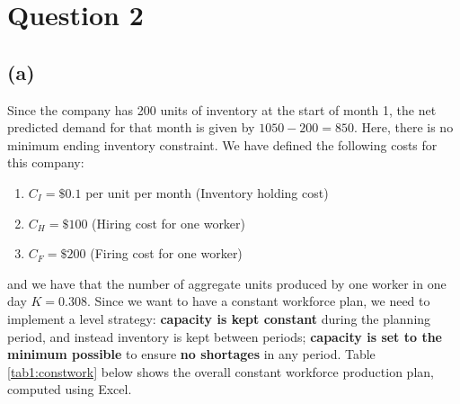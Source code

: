 \documentclass[12pt]{article}
\begin{document}
\newpage 

\section*{Question 2}


\subsection*{(a)}   

Since the company has 200 units of inventory at the start of month 1, the net predicted demand for that month is given by $1050 - 200 = 850$. Here, there is no minimum ending inventory constraint. We have defined the following costs for this company: \begin{enumerate}
    \item $C_I = \$0.1$ per unit per month (Inventory holding cost)
    \item $C_H = \$ 100$ (Hiring cost for one worker)
    \item $C_F = \$200$ (Firing cost for one worker)
\end{enumerate} and we have that the number of aggregate units produced by one worker in one day $K = 0.308$. Since we want to have a constant workforce plan, we need to implement a level strategy: \textbf{capacity is kept constant} during the planning period, and instead inventory is kept between periods; \textbf{capacity is set to the minimum possible} to ensure \textbf{no shortages} in any period. Table \ref{tab1:constwork} below shows the overall constant workforce production plan, computed using Excel. 
\end{document}
